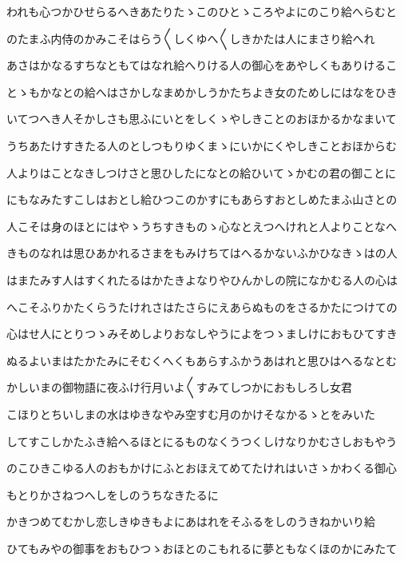\documentclass[a4paper,11pt,landscape]{ltjtarticle}
\begin{document}
\par\medskip
われも心つかひせらるへきあたりたゝこのひとゝころやよにのこり給へらむと
\par\medskip
のたまふ内侍のかみこそはらう〱しくゆへ〱しきかたは人にまさり給へれ
\par\medskip
あさはかなるすちなともてはなれ給へりける人の御心をあやしくもありけるこ
\par\medskip
とゝもかなとの給へはさかしなまめかしうかたちよき女のためしにはなをひき
\par\medskip
いてつへき人そかしさも思ふにいとをしくゝやしきことのおほかるかなまいて
\par\medskip
うちあたけすきたる人のとしつもりゆくまゝにいかにくやしきことおほからむ
\par\medskip
人よりはことなきしつけさと思ひしたになとの給ひいてゝかむの君の御ことに
\par\medskip
にもなみたすこしはおとし給ひつこのかすにもあらすおとしめたまふ山さとの
\par\medskip
人こそは身のほとにはやゝうちすきものゝ心なとえつへけれと人よりことなへ
\par\medskip
きものなれは思ひあかれるさまをもみけちてはへるかないふかひなきゝはの人
\par\medskip
はまたみす人はすくれたるはかたきよなりやひんかしの院になかむる人の心は
\par\medskip
へこそふりかたくらうたけれさはたさらにえあらぬものをさるかたにつけての
\par\medskip
心はせ人にとりつゝみそめしよりおなしやうによをつゝましけにおもひてすき
\par\medskip
ぬるよいまはたかたみにそむくへくもあらすふかうあはれと思ひはへるなとむ
\par\medskip
かしいまの御物語に夜ふけ行月いよ〱すみてしつかにおもしろし女君
\par\medskip
こほりとちいしまの水はゆきなやみ空すむ月のかけそなかるゝとをみいた
\par\medskip
してすこしかたふき給へるほとにるものなくうつくしけなりかむさしおもやう
\par\medskip
のこひきこゆる人のおもかけにふとおほえてめてたけれはいさゝかわくる御心
\par\medskip
もとりかさねつへしをしのうちなきたるに
\par\medskip
かきつめてむかし恋しきゆきもよにあはれをそふるをしのうきねかいり給
\par\medskip
ひてもみやの御事をおもひつゝおほとのこもれるに夢ともなくほのかにみたて
\par\medskip
\end{document}
